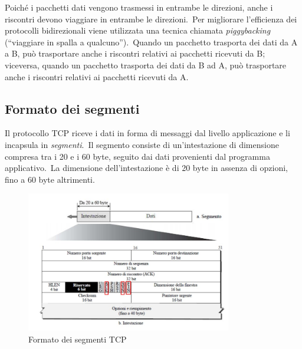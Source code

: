 Poiché i pacchetti dati vengono trasmessi in entrambe le direzioni, anche i riscontri devono viaggiare in entrambe le direzioni.\
Per migliorare l'efficienza dei protocolli bidirezionali viene utilizzata una tecnica chiamata \emph{piggybacking} (``viaggiare in spalla a qualcuno'').\
Quando un pacchetto trasporta dei dati da A a B, può trasportare anche i riscontri relativi ai pacchetti ricevuti da B; viceversa, quando un pacchetto trasporta dei dati da B ad A, può trasportare anche i riscontri relativi ai pacchetti ricevuti da A.

\subsection{Formato dei segmenti}

Il protocollo TCP riceve i dati in forma di messaggi dal livello applicazione e li incapsula in \emph{segmenti}.\
Il segmento consiste di un'intestazione di dimensione compresa tra i 20 e i 60 byte, seguito dai dati provenienti dal programma applicativo.\
La dimensione dell'intestazione è di 20 byte in assenza di opzioni, fino a 60 byte altrimenti.

\begin{figure}[H]
    \centering
    \includegraphics[width=0.8\textwidth]{immagini/SegmentoTCP.jpg}
    \caption*{Formato dei segmenti TCP}
\end{figure}

